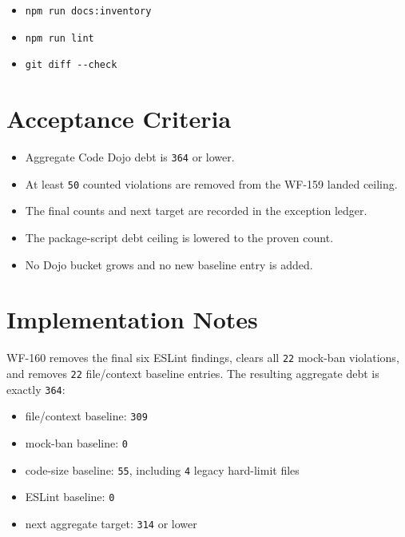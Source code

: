 \begin{itemize}
\item
  \texttt{n\allowbreak{}p\allowbreak{}m\allowbreak{} \allowbreak{}r\allowbreak{}u\allowbreak{}n\allowbreak{} \allowbreak{}d\allowbreak{}o\allowbreak{}c\allowbreak{}s\allowbreak{}:\allowbreak{}i\allowbreak{}n\allowbreak{}v\allowbreak{}e\allowbreak{}n\allowbreak{}t\allowbreak{}o\allowbreak{}r\allowbreak{}y}
\item
  \texttt{n\allowbreak{}p\allowbreak{}m\allowbreak{} \allowbreak{}r\allowbreak{}u\allowbreak{}n\allowbreak{} \allowbreak{}l\allowbreak{}i\allowbreak{}n\allowbreak{}t}
\item
  \texttt{g\allowbreak{}i\allowbreak{}t\allowbreak{} \allowbreak{}d\allowbreak{}i\allowbreak{}f\allowbreak{}f\allowbreak{} \allowbreak{}-\allowbreak{}-\allowbreak{}c\allowbreak{}h\allowbreak{}e\allowbreak{}c\allowbreak{}k}
\end{itemize}

\section{Acceptance Criteria}\label{record-242-acceptance-criteria}

\begin{itemize}
\tightlist
\item
  Aggregate Code Dojo debt is \texttt{3\allowbreak{}6\allowbreak{}4} or lower.
\item
  At least \texttt{5\allowbreak{}0} counted violations are removed from the WF-159 landed ceiling.
\item
  The final counts and next target are recorded in the exception ledger.
\item
  The package-script debt ceiling is lowered to the proven count.
\item
  No Dojo bucket grows and no new baseline entry is added.
\end{itemize}

\section{Implementation Notes}\label{record-242-implementation-notes}

WF-160 removes the final six ESLint findings, clears all \texttt{2\allowbreak{}2} mock-ban violations, and removes \texttt{2\allowbreak{}2} file/context baseline entries. The resulting aggregate debt is exactly \texttt{3\allowbreak{}6\allowbreak{}4}:

\begin{itemize}
\tightlist
\item
  file/context baseline: \texttt{3\allowbreak{}0\allowbreak{}9}
\item
  mock-ban baseline: \texttt{0}
\item
  code-size baseline: \texttt{5\allowbreak{}5}, including \texttt{4} legacy hard-limit files
\item
  ESLint baseline: \texttt{0}
\item
  next aggregate target: \texttt{3\allowbreak{}1\allowbreak{}4} or lower
\end{itemize}

